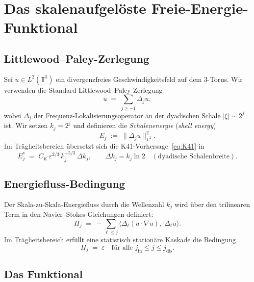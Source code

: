 \documentclass[12pt,a4paper]{article}
\theoremstyle{definition}
\theoremstyle{plain}
\theoremstyle{remark}
\begin{document}
\section{Das skalenaufgelöste Freie-Energie-Funktional}\label{sec:functional}

\subsection{Littlewood--Paley-Zerlegung}

Sei $u \in L^2(\mathbb{T}^3)$ ein divergenzfreies Geschwindigkeitsfeld auf dem
3-Torus. Wir verwenden die Standard-Littlewood--Paley-Zerlegung
\begin{equation}\label{eq:LP}
  u \;=\; \sum_{j \ge -1} \Delta_j u,
\end{equation}
wobei $\Delta_j$ der Frequenz-Lokalisierungsoperator an der dyadischen Schale
$|\xi| \sim 2^j$ ist. Wir setzen $k_j = 2^j$ und definieren die \emph{Schalenenergie} (\emph{shell energy})
\begin{equation}\label{eq:Ej}
  E_j \;:=\; \|\Delta_j u\|_{L^2}^2.
\end{equation}
Im Trägheitsbereich übersetzt sich die K41-Vorhersage~\eqref{eq:K41} in
\begin{equation}\label{eq:Ej_star}
  E_j^* \;=\; C_K\, \varepsilon^{2/3}\, k_j^{-5/3} \,\Delta k_j,
  \qquad \Delta k_j = k_j \ln 2 \quad (\text{dyadische Schalenbreite}).
\end{equation}

\subsection{Energiefluss-Bedingung}

Der Skala-zu-Skala-Energiefluss durch die Wellenzahl $k_j$ wird über den
trilinearen Term in den Navier--Stokes-Gleichungen definiert:
\begin{equation}\label{eq:flux}
  \Pi_j \;=\; -\sum_{\ell \le j}
    \langle \Delta_\ell(u \cdot \nabla u),\; \Delta_\ell u \rangle.
\end{equation}
Im Trägheitsbereich erfüllt eine statistisch stationäre Kaskade die Bedingung
\begin{equation}\label{eq:const_flux}
  \Pi_j \;=\; \varepsilon \quad \text{für alle } j_{\mathrm{in}} \le j \le j_{\mathrm{dis}}.
\end{equation}

\subsection{Das Funktional}
\end{document}
